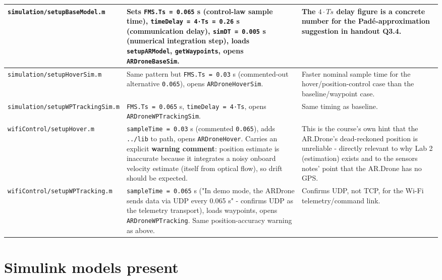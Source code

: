 \documentclass[11pt]{article}
\begin{document}
\begin{center}
\begin{longtable}{|p{2.9cm}|p{4.7cm}|p{6.6cm}|}
\hline
\texttt{simulation/\allowbreak{}setupBaseModel.m} & Sets \texttt{FMS.Ts = 0.065} s (control-law sample time), \texttt{timeDelay = 4·Ts = 0.26} s (communication delay), \texttt{simDT = 0.005} s (numerical integration step), loads \texttt{setupARModel}, \texttt{getWaypoints}, opens \texttt{ARDroneBaseSim}. & The $4\cdot Ts$ delay figure is a concrete number for the Padé-approximation suggestion in handout Q3.4. \\
\hline
\texttt{simulation/\allowbreak{}setupHoverSim.m} & Same pattern but \texttt{FMS.Ts = 0.03} s (commented-out alternative \texttt{0.065}), opens \texttt{ARDroneHoverSim}. & Faster nominal sample time for the hover/position-control case than the baseline/waypoint case. \\
\hline
\texttt{simulation/\allowbreak{}setupWPTrackingSim.m} & \texttt{FMS.Ts = 0.065} s, \texttt{timeDelay = 4·Ts}, opens \texttt{ARDroneWPTrackingSim}. & Same timing as baseline. \\
\hline
\texttt{wifiControl/\allowbreak{}setupHover.m} & \texttt{sampleTime = 0.03} s (commented \texttt{0.065}), adds \texttt{../lib} to path, opens \texttt{ARDroneHover}. Carries an explicit \textbf{warning comment}: position estimate is inaccurate because it integrates a noisy onboard velocity estimate (itself from optical flow), so drift should be expected. & This is the course's own hint that the AR.Drone's dead-reckoned position is unreliable - directly relevant to why Lab 2 (estimation) exists and to the sensors notes' point that the AR.Drone has no GPS. \\
\hline
\texttt{wifiControl/\allowbreak{}setupWPTracking.m} & \texttt{sampleTime = 0.065} s ("In demo mode, the ARDrone sends data via UDP every 0.065 s" - confirms UDP as the telemetry transport), loads waypoints, opens \texttt{ARDroneWPTracking}. Same position-accuracy warning as above. & Confirms UDP, not TCP, for the Wi-Fi telemetry/command link. \\
\hline
\end{longtable}
\end{center}

\section{Simulink models present}
\end{document}
